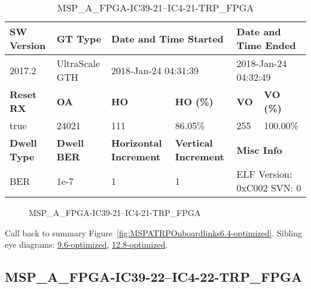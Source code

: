\begin{table}[h]
\centering
\caption{MSP\_A\_FPGA-IC39-21--IC4-21-TRP\_FPGA}
\label{tab:MSPAFPGAIC3921IC421TRPFPGA6.4-optimized}
\begin{tabular}{@{}|l|l|l|l|l|l|@{}}
\toprule
\textbf{SW Version}                & \textbf{GT Type}   & \multicolumn{2}{l|}{\textbf{Date and Time Started}}            & \multicolumn{2}{l|}{\textbf{Date and Time Ended}}        \\ \midrule
2017.2                       & UltraScale GTH          & \multicolumn{2}{l|}{2018-Jan-24 04:31:39}                   & \multicolumn{2}{l|}{2018-Jan-24 04:32:49}               \\ \midrule
\textbf{Reset RX}                  & \textbf{OA} & \textbf{HO}   & \textbf{HO (\%)} & \textbf{VO} & \textbf{VO (\%)} \\ \midrule
true & 24021        & 111          & 86.05\%        & 255        & 100.00\%       \\ \midrule
\textbf{Dwell Type}                & \textbf{Dwell BER} & \textbf{Horizontal Increment} & \textbf{Vertical Increment}    & \multicolumn{2}{l|}{\textbf{Misc Info}}                  \\ \midrule
BER                            & 1e-7        & 1        & 1           & \multicolumn{2}{l|}{ELF Version: 0xC002 SVN: 0}                         \\ \bottomrule
\end{tabular}
\end{table}

\begin{figure}[h]
\caption{MSP\_A\_FPGA-IC39-21--IC4-21-TRP\_FPGA} \label{fig:MSPAFPGAIC3921IC421TRPFPGA6.4-optimized}
\end{figure}

Call back to summary Figure~\ref{fig:MSPATRPOnboardlinks6.4-optimized}.
Sibling eye diagrams: \hyperref[sec:MSPAFPGAIC3921IC421TRPFPGA9.6-optimized]{9.6-optimized}, \hyperref[sec:MSPAFPGAIC3921IC421TRPFPGA12.8-optimized]{12.8-optimized}.

\clearpage
\newpage


\subsection{MSP\_A\_FPGA-IC39-22--IC4-22-TRP\_FPGA}\label{sec:MSPAFPGAIC3922IC422TRPFPGA6.4-optimized}

